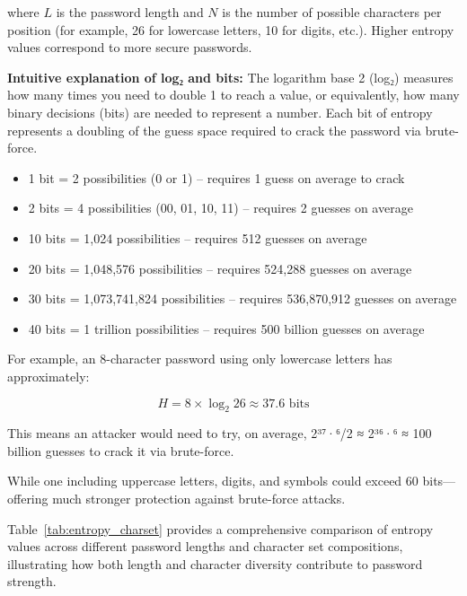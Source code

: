 where $L$ is the password length and $N$ is the number of possible characters per position (for example, 26 for lowercase letters, 10 for digits, etc.). Higher entropy values correspond to more secure passwords.

\textbf{Intuitive explanation of log₂ and bits:}
The logarithm base 2 (log₂) measures how many times you need to double 1 to reach a value, or equivalently, how many binary decisions (bits) are needed to represent a number. Each bit of entropy represents a doubling of the guess space required to crack the password via brute-force.
\begin{itemize}
    \item 1 bit = 2 possibilities (0 or 1) -- requires 1 guess on average to crack
    \item 2 bits = 4 possibilities (00, 01, 10, 11) -- requires 2 guesses on average
    \item 10 bits = 1,024 possibilities -- requires 512 guesses on average
    \item 20 bits = 1,048,576 possibilities -- requires 524,288 guesses on average
    \item 30 bits = 1,073,741,824 possibilities -- requires 536,870,912 guesses on average
    \item 40 bits = 1 trillion possibilities -- requires 500 billion guesses on average
\end{itemize}
For example, an 8-character password using only lowercase letters has approximately:

\begin{equation}
H = 8 \times \log_2 26 \approx 37.6 \text{ bits}
\end{equation}

This means an attacker would need to try, on average, 2³⁷·⁶/2 ≈ 2³⁶·⁶ ≈ 100 billion guesses to crack it via brute-force.

While one including uppercase letters, digits, and symbols could exceed 60 bits---offering much stronger protection against brute-force attacks.

Table~\ref{tab:entropy_charset} provides a comprehensive comparison of entropy values across different password lengths and character set compositions, illustrating how both length and character diversity contribute to password strength.

